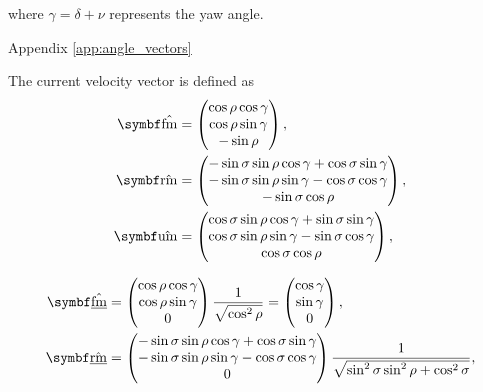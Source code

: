 
where $\gamma = \delta + \nu$ represents the yaw angle.

Appendix \ref{app:angle_vectors}

The current velocity vector is defined as
\begin{align*}
\uvec{\fmove} &=
\begin{pmatrix}
	\cos\rho\cos\gamma\\
	\cos\rho\sin\gamma\\
	-\sin\rho
\end{pmatrix},\\
\uvec{\rmove} &=
\begin{pmatrix}
	-\sin\sigma\sin\rho\cos\gamma + \cos\sigma\sin\gamma\\
	-\sin\sigma\sin\rho\sin\gamma - \cos\sigma\cos\gamma\\
	-\sin\sigma\cos\rho
\end{pmatrix},\\
\uvec{\umove} &=
\begin{pmatrix}
	\cos\sigma\sin\rho\cos\gamma + \sin\sigma\sin\gamma\\
	\cos\sigma\sin\rho\sin\gamma - \sin\sigma\cos\gamma\\
	\cos\sigma\cos\rho
\end{pmatrix},
\end{align*}


\begin{align*}
\uvec{\flat{\fmove}} &=
\begin{pmatrix}
	\cos\rho\cos\gamma\\
	\cos\rho\sin\gamma\\
	0
\end{pmatrix} \frac{1}{\sqrt{\cos^2\rho}} =
\begin{pmatrix}
	\cos\gamma\\
	\sin\gamma\\
	0
\end{pmatrix},\\
\uvec{\flat{\rmove}} &=
\begin{pmatrix}
	-\sin\sigma\sin\rho\cos\gamma + \cos\sigma\sin\gamma\\
	-\sin\sigma\sin\rho\sin\gamma - \cos\sigma\cos\gamma\\
	0
\end{pmatrix} \frac{1}{\sqrt{\sin^2\sigma\sin^2\rho + \cos^2\sigma}},
\end{align*}

